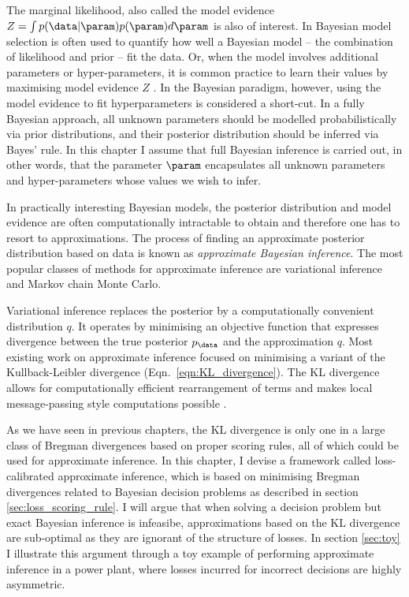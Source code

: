 \cbstart
The marginal likelihood, also called the model evidence $Z = \int p(\data\vert\param) p(\param) d\param$ is also of interest. In Bayesian model selection is often used to quantify how well a Bayesian model -- the combination of likelihood and prior -- fit the data. Or, when the model involves additional parameters or hyper-parameters, it is common practice to learn their values by maximising model evidence $Z$ \citep[see \eg][Chapter 5]{Rasmussen2006}. In the Bayesian paradigm, however, using the model evidence to fit hyperparameters is considered a short-cut. In a fully Bayesian approach, all unknown parameters should be modelled probabilistically via prior distributions, and their posterior distribution should be inferred via Bayes' rule. In this chapter I assume that full Bayesian inference is carried out, in other words, that the parameter $\param$ encapsulates all unknown parameters and hyper-parameters whose values we wish to infer.
\cbend

In practically interesting Bayesian models, the posterior distribution and model evidence are often computationally intractable to obtain and therefore one has to resort to approximations. The process of finding an approximate posterior distribution based on data is known as \emph{approximate Bayesian inference}. The most popular classes of methods for approximate inference are variational inference and Markov chain Monte Carlo.

Variational inference replaces the posterior by a computationally convenient distribution $q$. It operates by minimising an objective function that expresses divergence between the true posterior $p_\data$ and the approximation $q$. Most existing work on approximate inference focused on minimising a variant of the Kullback-Leibler divergence (Eqn.\ \eqref{eqn:KL_divergence}). The KL divergence allows for computationally efficient rearrangement of terms and makes local message-passing style computations possible \citep{Minka2001,Winn2006}.

As we have seen in previous chapters, the KL divergence is only one in a large class of Bregman divergences based on proper scoring rules, all of which could be used for approximate inference. In this chapter, I devise a framework called loss-calibrated approximate inference, which is based on minimising Bregman divergences related to Bayesian decision problems as described in section \ref{sec:loss_scoring_rule}. I will argue that when solving a decision problem but exact Bayesian inference is infeasibe, approximations based on the KL divergence are sub-optimal as they are ignorant of the structure of losses. In section \ref{sec:toy} I illustrate this argument through a toy example of performing approximate inference in a power plant, where losses incurred for incorrect decisions are highly asymmetric.

